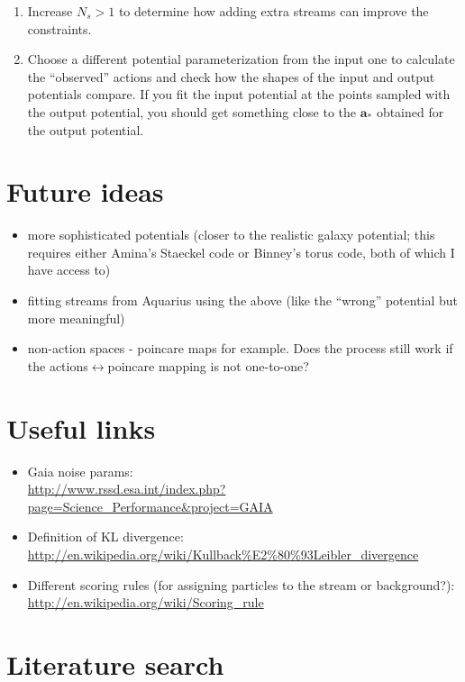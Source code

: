 \documentclass[useAMS,usenatbib,a4paper,referee]{mn2e}
\begin{document}
\begin{enumerate}
\item Increase $N_s>1$ to determine how adding extra streams can improve the constraints.

\item Choose a different potential parameterization from the input one to calculate the ``observed'' actions and check how the shapes of the input and output potentials compare. If you fit the input potential at the points sampled with the output potential, you should get something close to the $\mathbf{a}_*$ obtained for the output potential.

\end{enumerate}

\section{Future ideas}
\label{sec:future}
\begin{itemize}
 \item more sophisticated potentials (closer to the realistic galaxy potential; this requires either Amina's Staeckel code or Binney's torus code, both of which I have access to)
\item fitting streams from Aquarius using the above (like the ``wrong'' potential but more meaningful) 
\item non-action spaces - poincare maps for example. Does the process still work if the actions$\leftrightarrow$poincare mapping is not one-to-one?
\end{itemize}

\section{Useful links}
\begin{itemize}
 \item Gaia noise params:\\ \url{http://www.rssd.esa.int/index.php?page=Science_Performance&project=GAIA}
\item Definition of KL divergence:\\ \url{http://en.wikipedia.org/wiki/Kullback%E2%80%93Leibler_divergence}
\item Different scoring rules (for assigning particles to the stream or background?):\\ \url{http://en.wikipedia.org/wiki/Scoring_rule}
\end{itemize}


\section{Literature search}
\label{sec:alreadyDone}
\end{document}
